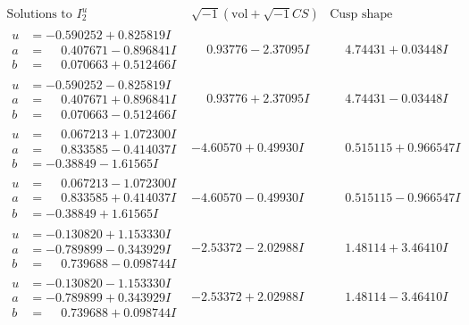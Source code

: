 \documentclass[1p]{elsarticle_modified}
\theoremstyle{definition}
\newcommand{\I}{\sqrt{-1}}
\begin{document}
$$\begin{array}{c|c|c}  
\text{Solutions to }I^u_{2}& \I (\text{vol} + \sqrt{-1}CS) & \text{Cusp shape}\\
 \hline 
\begin{aligned}
u &= -0.590252 + 0.825819 I \\
a &= \phantom{-}0.407671 - 0.896841 I \\
b &= \phantom{-}0.070663 + 0.512466 I\end{aligned}
 & \phantom{-}0.93776 - 2.37095 I & \phantom{-}4.74431 + 0.03448 I \\ \hline\begin{aligned}
u &= -0.590252 - 0.825819 I \\
a &= \phantom{-}0.407671 + 0.896841 I \\
b &= \phantom{-}0.070663 - 0.512466 I\end{aligned}
 & \phantom{-}0.93776 + 2.37095 I & \phantom{-}4.74431 - 0.03448 I \\ \hline\begin{aligned}
u &= \phantom{-}0.067213 + 1.072300 I \\
a &= \phantom{-}0.833585 - 0.414037 I \\
b &= -0.38849 - 1.61565 I\end{aligned}
 & -4.60570 + 0.49930 I & \phantom{-}0.515115 + 0.966547 I \\ \hline\begin{aligned}
u &= \phantom{-}0.067213 - 1.072300 I \\
a &= \phantom{-}0.833585 + 0.414037 I \\
b &= -0.38849 + 1.61565 I\end{aligned}
 & -4.60570 - 0.49930 I & \phantom{-}0.515115 - 0.966547 I \\ \hline\begin{aligned}
u &= -0.130820 + 1.153330 I \\
a &= -0.789899 - 0.343929 I \\
b &= \phantom{-}0.739688 - 0.098744 I\end{aligned}
 & -2.53372 - 2.02988 I & \phantom{-}1.48114 + 3.46410 I \\ \hline\begin{aligned}
u &= -0.130820 - 1.153330 I \\
a &= -0.789899 + 0.343929 I \\
b &= \phantom{-}0.739688 + 0.098744 I\end{aligned}
 & -2.53372 + 2.02988 I & \phantom{-}1.48114 - 3.46410 I \\ \hline\begin{aligned}

\end{aligned}
\end{array}$$
\end{document}
